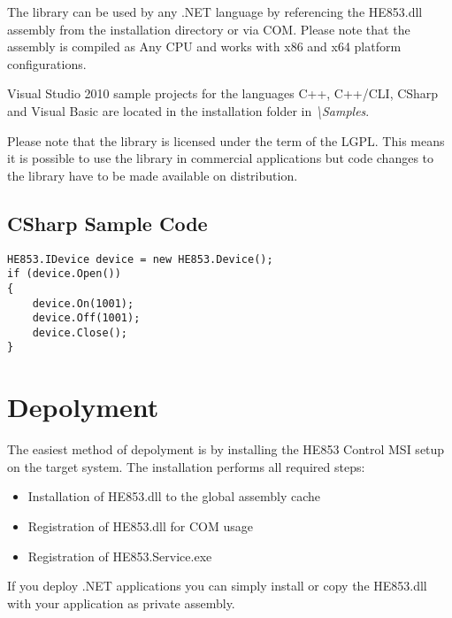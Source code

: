 \documentclass[
a4paper,
oneside,
halfparskip*,
normalheadings,
]
{scrbook}
\begin{document}
The library can be used by any .NET language by referencing the HE853.dll assembly from the
installation directory or via COM. Please note that the assembly is compiled as Any CPU
and works with x86 and x64 platform configurations.

Visual Studio 2010 sample projects for the languages C++, C++/CLI, CSharp and Visual Basic
are located in the installation folder in \textit{\textbackslash Samples}.

Please note that the library is licensed under the term of the LGPL. This means it is
possible to use the library in commercial applications but code changes to the library
have to be made available on distribution.

\subsection{CSharp Sample Code}

\begin{verbatim}
HE853.IDevice device = new HE853.Device();
if (device.Open())
{
    device.On(1001);
    device.Off(1001);
    device.Close();
}
\end{verbatim}

\section{Depolyment}
The easiest method of depolyment is by installing the HE853 Control MSI setup on the target
system. The installation performs all required steps:

\begin{itemize}
  \item Installation of HE853.dll to the global assembly cache
	\item Registration of HE853.dll for COM usage
	\item Registration of HE853.Service.exe
\end{itemize}

If you deploy .NET applications you can simply install or copy the HE853.dll with your application
as private assembly.
\end{document}
